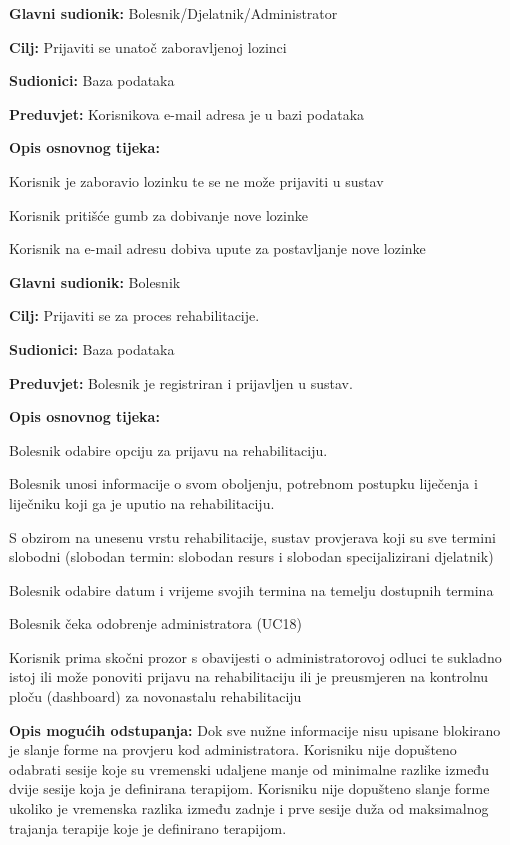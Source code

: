 \documentclass[12pt]{report}
\newenvironment{packed_enum}{
	\begin{enumerate}
		\setlength{\itemsep}{0pt}
		\setlength{\parskip}{0pt}
		\setlength{\parsep}{0pt}
	}{\end{enumerate}}
\begin{document}
	\item \textbf{Glavni sudionik:} Bolesnik/Djelatnik/Administrator
 	\item \textbf{Cilj:} Prijaviti se unatoč zaboravljenoj lozinci
  	\item \textbf{Sudionici:} Baza podataka
   	\item \textbf{Preduvjet:} Korisnikova e-mail adresa je u bazi podataka
    	\item \textbf{Opis osnovnog tijeka:}
     	\begin{packed_enum}
      		\item Korisnik je zaboravio lozinku te se ne može prijaviti u sustav
		\item Korisnik pritišće gumb za dobivanje nove lozinke
  		\item Korisnik na e-mail adresu dobiva upute za postavljanje nove lozinke
    	\end{packed_enum}
\closeusecase


	\item \textbf{Glavni sudionik:} Bolesnik
	\item \textbf{Cilj:} Prijaviti se za proces rehabilitacije.
	\item \textbf{Sudionici:} Baza podataka
	\item \textbf{Preduvjet:} Bolesnik je registriran i prijavljen u sustav.
	\item \textbf{Opis osnovnog tijeka:}
	\begin{packed_enum}
		\item Bolesnik odabire opciju za prijavu na rehabilitaciju.
		\item Bolesnik unosi informacije o svom oboljenju, potrebnom postupku liječenja i liječniku koji ga je uputio na rehabilitaciju.
        	\item S obzirom na unesenu vrstu rehabilitacije, sustav provjerava koji su sve termini slobodni (slobodan termin: slobodan resurs i slobodan specijalizirani djelatnik) 
		\item Bolesnik odabire datum i vrijeme svojih termina na temelju dostupnih termina 
        	\item Bolesnik čeka odobrenje administratora (UC18) 
        	\item Korisnik prima skočni prozor s obavijesti o administratorovoj odluci te sukladno istoj ili može ponoviti prijavu na rehabilitaciju ili je preusmjeren na kontrolnu ploču (dashboard) za novonastalu rehabilitaciju
	\end{packed_enum}
	\item \textbf{Opis mogućih odstupanja:}
	Dok sve nužne informacije nisu upisane blokirano je slanje forme na provjeru kod administratora. 
    Korisniku nije dopušteno odabrati sesije koje su vremenski udaljene manje od minimalne razlike između dvije sesije koja je definirana terapijom. 
    Korisniku nije dopušteno slanje forme ukoliko je vremenska razlika između zadnje i prve sesije duža od maksimalnog trajanja terapije koje je definirano terapijom.
\closeusecase
\end{document}
